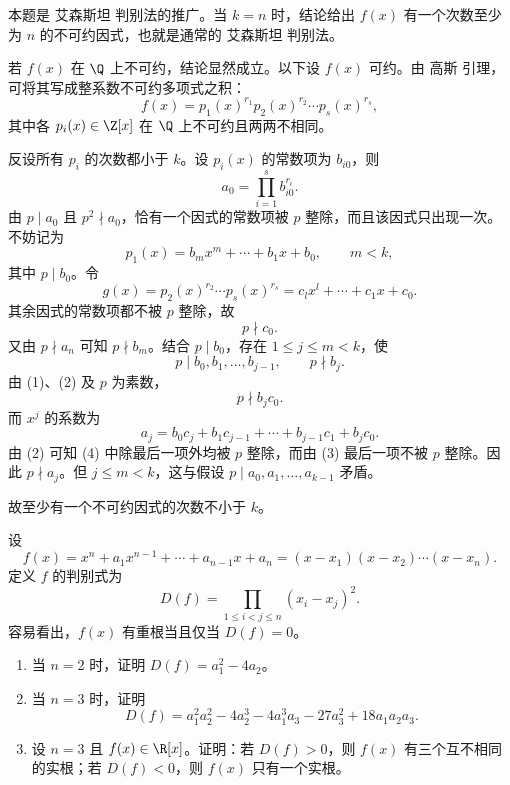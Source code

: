 \begin{solution}
	本题是 艾森斯坦 判别法的推广。当 \(k=n\) 时，结论给出 \(f(x)\) 有一个次数至少为 \(n\) 的不可约因式，也就是通常的 艾森斯坦 判别法。
	
	若 \(f(x)\) 在 \(\Q\) 上不可约，结论显然成立。以下设 \(f(x)\) 可约。由 高斯 引理，可将其写成整系数不可约多项式之积：
	\[
	f(x)=p_1(x)^{r_1}p_2(x)^{r_2}\cdots p_s(x)^{r_s},
	\]
	其中各 \(p_i(x)\in\Z[x]\) 在 \(\Q\) 上不可约且两两不相同。
	
	反设所有 \(p_i\) 的次数都小于 \(k\)。设 \(p_i(x)\) 的常数项为 \(b_{i0}\)，则
	\[
	a_0=\prod_{i=1}^s b_{i0}^{r_i}.
	\]
	由 \(p\mid a_0\) 且 \(p^2\nmid a_0\)，恰有一个因式的常数项被 \(p\) 整除，而且该因式只出现一次。不妨记为
	\[
	p_1(x)=b_mx^m+\cdots+b_1x+b_0,
	\qquad m<k,
	\]
	其中 \(p\mid b_0\)。令
	\[
	g(x)=p_2(x)^{r_2}\cdots p_s(x)^{r_s}
	=c_lx^l+\cdots+c_1x+c_0.
	\]
	其余因式的常数项都不被 \(p\) 整除，故
	\begin{equation}
		p\nmid c_0.
		\tag{1}
	\end{equation}
	又由 \(p\nmid a_n\) 可知 \(p\nmid b_m\)。结合 \(p\mid b_0\)，存在 \(1\le j\le m<k\)，使
	\begin{equation}
		p\mid b_0,b_1,\ldots,b_{j-1},
		\qquad p\nmid b_j.
		\tag{2}
	\end{equation}
	由 (1)、(2) 及 \(p\) 为素数，
	\begin{equation}
		p\nmid b_jc_0.
		\tag{3}
	\end{equation}
	而 \(x^j\) 的系数为
	\begin{equation}
		a_j=b_0c_j+b_1c_{j-1}+\cdots+b_{j-1}c_1+b_jc_0.
		\tag{4}
	\end{equation}
	由 (2) 可知 (4) 中除最后一项外均被 \(p\) 整除，而由 (3) 最后一项不被 \(p\) 整除。因此 \(p\nmid a_j\)。但 \(j\le m<k\)，这与假设 \(p\mid a_0,a_1,\ldots,a_{k-1}\) 矛盾。
	
	故至少有一个不可约因式的次数不小于 \(k\)。
\end{solution}

\begin{problem}
	 设
	\[
	f(x)=x^n+a_1x^{n-1}+\cdots+a_{n-1}x+a_n
	=(x-x_1)(x-x_2)\cdots(x-x_n).
	\]
	\label{p1:concept:c1-l2482}定义 \(f\) 的判别式为
	\[
	D(f)=\prod_{1\le i<j\le n}(x_i-x_j)^2.
	\]
	容易看出，\(f(x)\) 有重根当且仅当 \(D(f)=0\)。
	\begin{enumerate}
		\item 当 \(n=2\) 时，证明 \(D(f)=a_1^2-4a_2\)。
		\item 当 \(n=3\) 时，证明
		\[
		D(f)=a_1^2a_2^2-4a_2^3-4a_1^3a_3-27a_3^2+18a_1a_2a_3.
		\]
		\item 设 \(n=3\) 且 \(f(x)\in\R[x]\)。证明：若 \(D(f)>0\)，则 \(f(x)\) 有三个互不相同的实根；若 \(D(f)<0\)，则 \(f(x)\) 只有一个实根。
	\end{enumerate}
\end{problem}

